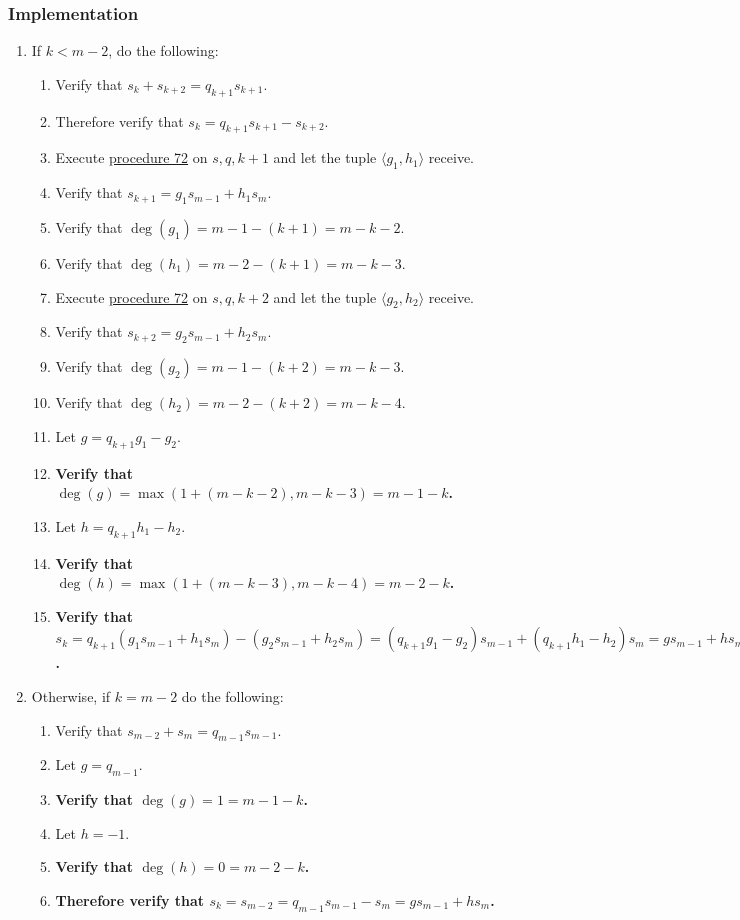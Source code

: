 \documentclass[twocolumn]{article}
\newcommand{\implementation}{\subsubsection*{Implementation}}
\begin{document}
			\implementation
				\begin{enumerate}
					\item If $k<m-2$, do the following:
					\begin{enumerate}
						\item Verify that $s_k+s_{k+2}=q_{k+1}s_{k+1}$.
						\item Therefore verify that $s_k=q_{k+1}s_{k+1}-s_{k+2}$.
						\item Execute \hyperref[sec:procedure 72]{procedure 72} on $s,q,k+1$ and let the tuple $\langle g_1,h_1\rangle$ receive.
						\item Verify that $s_{k+1}=g_1s_{m-1}+h_1s_m$.
						\item Verify that $\deg(g_1)=m-1-(k+1)=m-k-2$.
						\item Verify that $\deg(h_1)=m-2-(k+1)=m-k-3$.
						\item Execute \hyperref[sec:procedure 72]{procedure 72} on $s,q,k+2$ and let the tuple $\langle g_2,h_2\rangle$ receive.
						\item Verify that $s_{k+2}=g_2s_{m-1}+h_2s_m$.
						\item Verify that $\deg(g_2)=m-1-(k+2)=m-k-3$.
						\item Verify that $\deg(h_2)=m-2-(k+2)=m-k-4$.
						\item Let $g=q_{k+1}g_1-g_2$.
						\item \textbf{Verify that $\deg(g)=\max(1+(m-k-2),m-k-3)=m-1-k$.}
						\item Let $h=q_{k+1}h_1-h_2$.
						\item \textbf{Verify that $\deg(h)=\max(1+(m-k-3),m-k-4)=m-2-k$.}
						\item \textbf{Verify that $s_k=q_{k+1}(g_1s_{m-1}+h_1s_m)-(g_2s_{m-1}+h_2s_m)=(q_{k+1}g_1-g_2)s_{m-1}+(q_{k+1}h_1-h_2)s_m=gs_{m-1}+hs_m$.}
					\end{enumerate}
					\item Otherwise, if $k=m-2$ do the following:
					\begin{enumerate}
						\item Verify that $s_{m-2}+s_m=q_{m-1}s_{m-1}$.
						\item Let $g=q_{m-1}$.
						\item \textbf{Verify that $\deg(g)=1=m-1-k$.}
						\item Let $h=-1$.
						\item \textbf{Verify that $\deg(h)=0=m-2-k$.}
						\item \textbf{Therefore verify that $s_k=s_{m-2}=q_{m-1}s_{m-1}-s_m=gs_{m-1}+hs_m$.}

\end{enumerate}
\end{enumerate}
\end{document}
